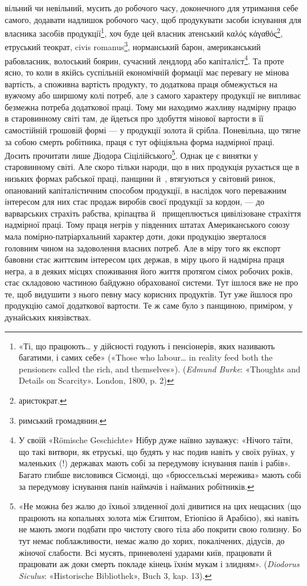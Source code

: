 \parcont{}  %
вільний чи невільний, мусить до робочого часу, доконечного для
утримання себе самого, додавати надлишок робочого часу, щоб
продукувати засоби існування для власника засобів продукції\footnote{
«Ті, що працюють\dots{} у дійсності годують і пенсіонерів, яких називають
багатими, і самих себе» («Those who labour\dots{} in reality feed both
the pensioners called the rich, and themselves»). (\emph{Edmund Burke}: «Thoughts and
Details on Scarcity». London, 1800, p. 2)
},
хоч буде цей власник атенський \textgreek{καλός κἁγαθός}\footnote*{
аристократ. 
}, етруський теократ,
civis romanus\footnote*{римський громадянин. },
норманський барон, американський рабовласник,
волоський боярин, сучасний лендлорд або капіталіст\footnote{
У своїй «Römische Geschichte» Нібур дуже наївно зауважує: «Нічого
таїти, що такі витвори, як етруські, що будять у нас подив навіть у
своїх руїнах, у маленьких (!) державах мають собі за передумову існування
панів і рабів». Багато глибше висловився Сісмонді, що «брюссельські
мережива» мають собі за передумову існування панів наймачів і найманих
робітників.
}.
Та проте ясно, то коли в якійсь суспільній економічній формації
має перевагу не мінова вартість, а споживна вартість продукту,
то додаткова праця обмежується на вужчому або ширшому колі
потреб, але з самого характеру продукції не випливає безмежна
потреба додаткової праці. Тому ми находимо жахливу надмірну
працю в старовинному світі там, де йдеться про здобуття мінової
вартости в її самостійній грошовій формі — у продукції золота
й срібла. Поневільна, що тягне за собою смерть робітника, праця
є тут офіціяльна форма надмірної праці. Досить прочитати лише
Діодора Сіцілійського\footnote{
«Не можна без жалю до їхньої злиденної долі дивитися на цих нещасних
(що працюють на копальнях золота між Єгиптом, Етіопією й
Арабією), які навіть не мають змоги подбати про чистоту свого тіла або
покрити свою голизну. Бо тут немає поблажливости, немає жалю до
хорих, покалічених, дідусів, до жіночої слабости. Всі мусять, приневолені
ударами київ, працювати й працювати аж доки смерть покладе кінець
їхнім мукам і злидням». (\emph{Diodorus Siculus}: «Historische Bibliothek», Buch 3,
kap. 13).
}. Однак це є винятки у старовинному
світі. Але скоро тільки народи, що в них продукція рухається
ще в низьких формах рабської праці, панщини й~, втягуються
у світовий ринок, опанований капіталістичним способом продукції,
в наслідок чого переважним інтересом для них стає продаж виробів
своєї продукції за кордон, — до варварських страхіть рабства,
кріпацтва й~ прищеплюється цивілізоване страхіття надмірної
праці. Тому праця негрів у південних штатах Американського
союзу мала помірно-патріархальний характер доти, доки продукцію
зверталося головним чином на задоволення власних потреб.
Але в міру того як експорт бавовни стає життєвим інтересом цих
держав, в міру цього й надмірна праця негра, а в деяких місцях
споживання його життя протягом сімох робочих років, стає складовою
частиною байдужно обрахованої системи. Тут ішлося вже
не про те, щоб видушити з нього певну масу корисних продуктів.
Тут уже йшлося про продукцію самої додаткової вартости. Те ж
саме було з панщиною, приміром, у дунайських князівствах.
